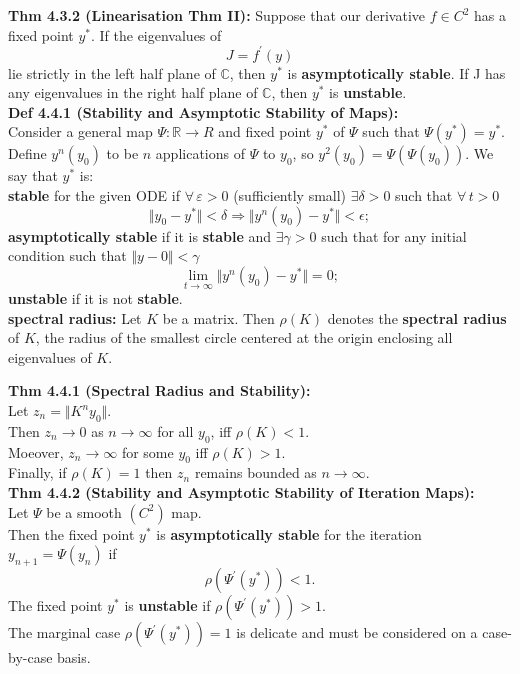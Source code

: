 \documentclass[10pt,a4paper]{article}
\newcommand{\R}{\mathbb{R}}
\newcommand{\C}{\mathbb{C}}
\renewcommand{\implies}{\Rightarrow}
\begin{document}
\begin{multicols*}{2}
\textbf{Thm 4.3.2 (Linearisation Thm II):} Suppose that our derivative $f \in C^2$ has a fixed point $y^*$. If the eigenvalues of 
\[
J = f^\prime(y)    
\]
lie strictly in the left half plane of $\C$, then $y^*$ is \textbf{asymptotically stable}. If J has any eigenvalues in the right half plane of $\C$, then $y^*$ is \textbf{unstable}.\\

\textbf{Def 4.4.1 (Stability and Asymptotic Stability of Maps):}\\
Consider a general map $\Psi : \R \to R$ and fixed point $y^*$ of $\Psi$ such that $\Psi(y^*) = y^*$. Define $y^n(y_0)$ to be $n$ applications of $\Psi$ to $y_0$, so $y^2(y_0) = \Psi(\Psi(y_0))$. We say that $y^*$ is:\\
\textbf{stable} for the given ODE if $\forall \, \varepsilon > 0$ (sufficiently small) $\exists \delta > 0$ such that $\forall \, t > 0$
\[
    \Vert y_0 - y^*\Vert  < \delta \implies \Vert y^n(y_0) - y^* \Vert < \epsilon;
\]
\textbf{asymptotically stable} if it is \textbf{stable} and $\exists \gamma > 0 $ such that for any initial condition such that $\Vert y-0 \Vert < \gamma$ 
\[
    \lim_{t \to \infty} \Vert y^n(y_0) - y^* \Vert = 0;
\]
\textbf{unstable} if it is not \textbf{stable}.\\

\textbf{spectral radius:} Let $K$ be a matrix. Then $\rho(K)$ denotes the \textbf{spectral radius} of $K$, the radius of the smallest circle centered at the origin enclosing all eigenvalues of $K$.

\textbf{Thm 4.4.1 (Spectral Radius and Stability):}\\
Let $z_n = \Vert K^ny_0 \Vert$.\\
Then $z_n \to 0$ as $n \to \infty$ for all $y_0$, iff $\rho(K) < 1$.\\
Moeover, $z_n \to \infty$ for some $y_0$ iff $\rho(K) > 1$.\\
Finally, if $\rho(K) = 1$ then $z_n$ remains bounded as $n \to \infty$.\\

\textbf{Thm 4.4.2 (Stability and Asymptotic Stability of Iteration Maps):} \\
Let $\Psi$ be a smooth $(C^2)$ map.\\
Then the fixed point $y^*$ is \textbf{asymptotically stable} for the iteration $y_{n+1} = \Psi(y_n)$ if 
\[
    \rho(\Psi^\prime(y^*)) < 1.
\] 
The fixed point $y^*$ is \textbf{unstable} if $\rho(\Psi^\prime(y^*)) > 1$.\\
The marginal case $\rho(\Psi^\prime(y^*)) = 1$ is delicate and must be considered on a case-by-case basis.\\




\end{multicols*}
\end{document}
